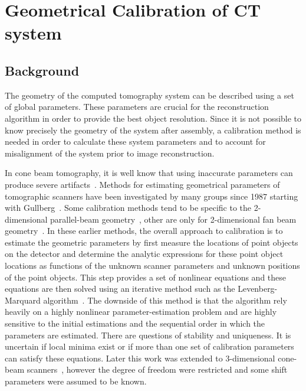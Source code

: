 \chapter{Geometrical Calibration of CT system}
\label{chap:calibration}

\section{Background}
The geometry of the computed tomography system can be described using a set of global parameters.  These parameters are crucial for the reconstruction algorithm in order to provide the best object resolution.  Since it is not possible to know precisely the geometry of the system after assembly, a calibration method is needed in order to calculate these system parameters and to account for misalignment of the system prior to image reconstruction.  

In cone beam tomography, it is well know that using inaccurate parameters can produce severe artifacts~\citep{Li1994a, Li1994b, Wang1998}. Methods for estimating geometrical parameters of tomographic scanners have been investigated by many groups since 1987 starting with Gullberg~\citep{Gullberg1987}.  Some calibration methods tend to be specific to the 2-dimensional parallel-beam geometry~\citep{Azevedo1990, Busemann1987}, other are only for 2-dimensional fan beam geometry~\citep{Crawford1988, Hsieh1999, Gullberg1987}.  In these earlier methods, the overall approach to calibration is to estimate the geometric parameters by first measure the locations of point objects on the detector and determine the analytic expressions for these point object locations as functions of the unknown scanner parameters and unknown positions of the point objects.  This step provides a set of nonlinear equations and these equations are then solved using an iterative method such as the Levenberg-Marquard algorithm~\citep{Rougee1993}.  The downside of this method is that the algorithm rely heavily on a highly nonlinear parameter-estimation problem and are highly sensitive to the initial estimations and the sequential order in which the parameters are estimated.  There are questions of stability and uniqueness.  It is uncertain if local minima exist or if more than one set of calibration parameters can satisfy these equations.  Later this work was extended to 3-dimensional cone-beam scanners~\citep{Gullberg1990}, however the degree of freedom were restricted and some shift parameters were assumed to be known.

